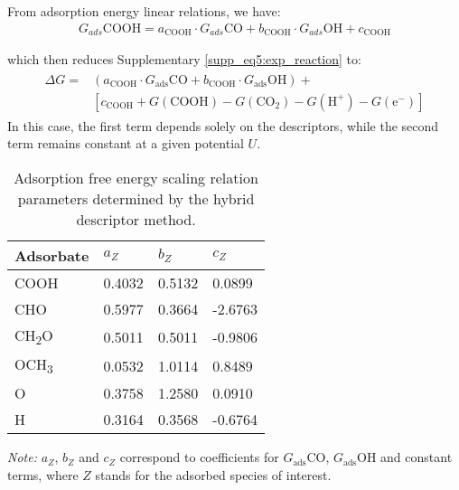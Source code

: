From adsorption energy linear relations, we have:
\begin{align}
  G_{ads}{\mathrm{COOH}} = a_{\text{COOH}} \cdot G_{ads}{\mathrm{CO}} +
  b_{\text{COOH}} \cdot G_{ads}{\mathrm{OH}} + c_{\text{COOH}}  \label{supp_eq6:eads}
\end{align}

which then reduces Supplementary \cref{supp_eq5:exp_reaction} to:
\begin{align}
  \begin{split}
    \Delta G = &(a_{\text{COOH}} \cdot G_{\text{ads}}{\mathrm{CO}} +
    b_{\text{COOH}} \cdot G_{\text{ads}}{\mathrm{OH}}) + \\
    &[c_{\text{COOH}} + G(\mathrm{COOH}) -
    G(\mathrm{CO}_2) - G(\mathrm{H}^+) - G(\mathrm{e}^-)]  \label{supp_eq7:reduced_eads}
  \end{split}
\end{align}
In this case, the first term depends solely on the descriptors, while the second term remains constant at a given potential $U$.

\begin{table}[htbp]
\label{supp_table13:scaling_params}
  \caption{Adsorption free energy scaling relation parameters
    determined by the hybrid descriptor method.}
  \center
  \small
  \begin{tabularx}{0.75\textwidth}{@{}l *{3}{X} @{}}
    \toprule
    Adsorbate             & $a_Z$   & $b_Z$   & $c_Z$    \\
    \midrule
    COOH                  & 0.4032  & 0.5132  &  0.0899  \\
    CHO                   & 0.5977  & 0.3664  & -2.6763  \\
    CH\textsubscript{2}O  & 0.5011  & 0.5011  & -0.9806  \\
    OCH\textsubscript{3}  & 0.0532  & 1.0114  &  0.8489  \\
    O                     & 0.3758  & 1.2580  &  0.0910  \\
    H                     & 0.3164  & 0.3568  & -0.6764  \\
    \bottomrule
  \end{tabularx}

  \smallskip

  \begin{flushright}
    \begin{minipage}{\textwidth}
      \footnotesize\textit{Note:} $a_{Z}$, $b_{Z}$ and $c_{Z}$ correspond
      to coefficients for $G_{\text{ads}}\text{CO}$, $G_{\text{ads}}\text{OH}$
      and constant terms, where $Z$ stands for the adsorbed species of interest.
  \end{minipage}
  \end{flushright}
\end{table}

